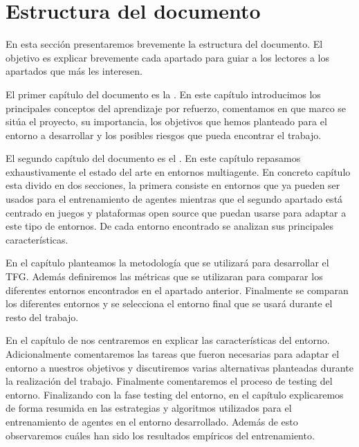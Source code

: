 \section{Estructura del documento}

En esta sección presentaremos brevemente la estructura del documento. El objetivo es explicar brevemente cada apartado para guiar a los lectores a los apartados que más les interesen.

El primer capítulo del documento es la . En este capítulo introducimos los principales conceptos del aprendizaje por refuerzo, comentamos en que marco se sitúa el proyecto, su importancia, los objetivos que hemos planteado para el entorno a desarrollar y los posibles riesgos que pueda encontrar el trabajo.


El segundo capítulo del documento es el . En este capítulo repasamos exhaustivamente el estado del arte en entornos multiagente. En concreto capítulo esta divido en dos secciones, la primera consiste en entornos que ya pueden ser usados para el entrenamiento de agentes mientras que el segundo apartado está centrado en juegos y plataformas open source que puedan usarse para adaptar a este tipo de entornos. De cada entorno encontrado se analizan sus principales características.


En el capítulo  planteamos la metodología que se utilizará para desarrollar el TFG. Además definiremos las métricas que se utilizaran para comparar los diferentes entornos encontrados en el apartado anterior. Finalmente se comparan los diferentes entornos y se selecciona el entorno final que se usará durante el resto del trabajo.



En el capítulo de  nos centraremos en explicar las características del entorno. Adicionalmente comentaremos las tareas que fueron necesarias para adaptar el entorno a nuestros objetivos y discutiremos varias alternativas planteadas durante la realización del trabajo. Finalmente comentaremos el proceso de testing del entorno. Finalizando con la fase testing del entorno, en el capítulo  explicaremos de forma resumida en las estrategias y algoritmos utilizados para el entrenamiento de agentes en el entorno desarrollado. Además de esto observaremos cuáles han sido los resultados empíricos del entrenamiento.



